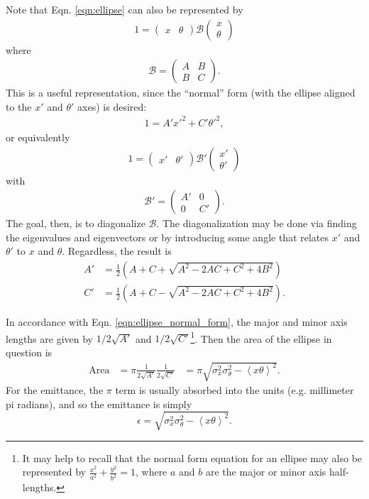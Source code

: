 Note that Eqn. \ref{eqn:ellipse} can also be represented by
\begin{align*}
1=\begin{pmatrix} x & \theta \end{pmatrix}	\mathcal{B} 	\begin{pmatrix} x\\ \theta \end{pmatrix}
\end{align*}
where
\begin{align*}
\mathcal{B}=
	\begin{pmatrix}
	A & B\\
	B & C
	\end{pmatrix}.
\end{align*}
This is a useful representation, since the ``normal'' form (with the ellipse aligned to the $x'$ and $\theta '$ axes) is desired:
\begin{align} \label{eqn:ellipse_normal_form}
1 = A'x'^2 + C'\theta '^2,
\end{align}
or equivalently
\begin{align*}
1 = \begin{pmatrix} x' & \theta ' \end{pmatrix}	\mathcal{B'} 	\begin{pmatrix} x'\\ \theta ' \end{pmatrix}
\end{align*}
with
\begin{align*}
\mathcal{B}'=\begin{pmatrix} A' & 0 \\ 0 & C' \end{pmatrix}.
\end{align*}
The goal, then, is to diagonalize $\mathcal{B}$. The diagonalization may be done via finding the eigenvalues and eigenvectors or by introducing some angle that relates $x'$ and $\theta '$ to $x$ and $\theta$. Regardless, the result is
\begin{align*}
A'&=\frac{1}{2}\left(A+C+\sqrt{A^2-2AC+C^2+4B^2}\right)\\
C'&=\frac{1}{2}\left(A+C-\sqrt{A^2-2AC+C^2+4B^2}\right).
\end{align*}

In accordance with Eqn. \ref{eqn:ellipse_normal_form}, the major and minor axis lengths are given by $1/2\sqrt{A'}$ and $1/2\sqrt{C'}$\footnote{It may help to recall that the normal form equation for an ellipse may also be represented by $\frac{x^2}{a^2}+\frac{y^2}{b^2}=1$, where $a$ and $b$ are the major or minor axis half-lengths.}. Then the area of the ellipse in question is
\begin{align*}
\text{Area}&=\pi\frac{1}{2\sqrt{A'}}\frac{1}{2\sqrt{C'}}
&=\pi\sqrt{\sigma_x^2\sigma_\theta^2 - \left<x\theta\right>^2}.
\end{align*}
For the emittance, the $\pi$ term is usually absorbed into the units (e.g. millimeter pi radians), and so the emittance is simply
\begin{equation}\label{emittance_appendix}
\epsilon=\sqrt{\sigma_x^2\sigma_\theta^2 - \left<x\theta\right>^2}.
\end{equation}


